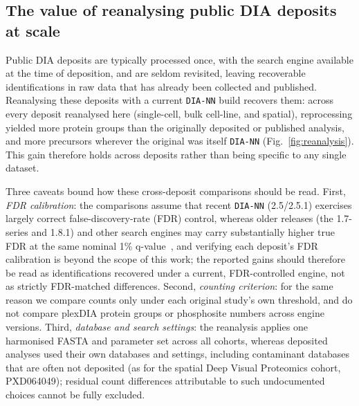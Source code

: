 \documentclass[preprint,12pt]{elsarticle}
\begin{document}
\subsection{The value of reanalysing public DIA deposits at scale}
\label{sec:reanalyses}

Public DIA deposits are typically processed once, with the search engine available at the time of deposition, and are seldom revisited, leaving recoverable identifications in raw data that has already been collected and published. Reanalysing these deposits with a current \texttt{DIA-NN} build recovers them: across every deposit reanalysed here (single-cell, bulk cell-line, and spatial), reprocessing yielded more protein groups than the originally deposited or published analysis, and more precursors wherever the original was itself \texttt{DIA-NN} (Fig.~\ref{fig:reanalysis}). This gain therefore holds across deposits rather than being specific to any single dataset.

Three caveats bound how these cross-deposit comparisons should be read. First, \emph{FDR calibration}: the comparisons assume that recent \texttt{DIA-NN} (2.5/2.5.1) exercises largely correct false-discovery-rate (FDR) control, whereas older releases (the 1.7-series and 1.8.1) and other search engines may carry substantially higher true FDR at the same nominal 1\% q-value~\cite{wen2025fdr,krull2024singlecell,frohlich2022benchmarking}, and verifying each deposit's FDR calibration is beyond the scope of this work; the reported gains should therefore be read as identifications recovered under a current, FDR-controlled engine, not as strictly FDR-matched differences. Second, \emph{counting criterion}: for the same reason we compare counts only under each original study's own threshold, and do not compare plexDIA protein groups or phosphosite numbers across engine versions. Third, \emph{database and search settings}: the reanalysis applies one harmonised FASTA and parameter set across all cohorts, whereas deposited analyses used their own databases and settings, including contaminant databases that are often not deposited (as for the spatial Deep Visual Proteomics cohort, PXD064049); residual count differences attributable to such undocumented choices cannot be fully excluded.
\end{document}
